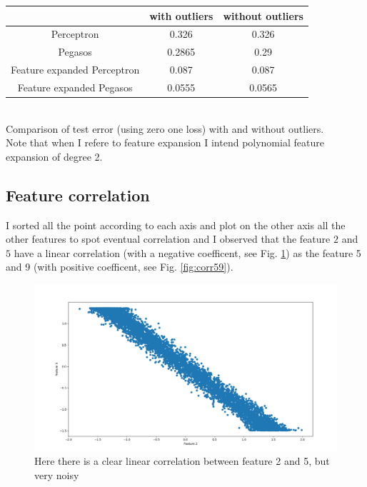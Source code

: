 \begin{center}
    \begin{tabular}{| c | c | c |}
    \hline
    & with outliers & without outliers \\
    \hline
    Perceptron & 0.326 & 0.326 \\
    \hline
    Pegasos & 0.2865 &  0.29  \\
    \hline
    Feature expanded Perceptron &  0.087 & 0.087 \\
    \hline
    Feature expanded Pegasos & 0.0555 & 0.0565  \\
    \hline
    \end{tabular}\\
    Comparison of test error (using zero one loss) with and without outliers.\\
    Note that when I refere to feature expansion I intend polynomial feature expansion of degree 2.\\
\end{center}

\subsection{Feature correlation}
I sorted all the point according to each axis and plot on the other axis all the other features to spot eventual correlation and I observed that the feature $2$ and $5$ have a linear correlation (with a negative coefficent, see Fig. \ref{fig:corr25}) as the feature 5 and 9 (with positive coefficent, see Fig. \ref{fig:corr59}).\\ 

\begin{figure}[h]
    \includegraphics[width=\textwidth]{images/feature_2_5_correlation.png}
    \caption{Here there is a clear linear correlation between feature 2 and 5, but very noisy}
    \label{fig:corr25}
\end{figure}

